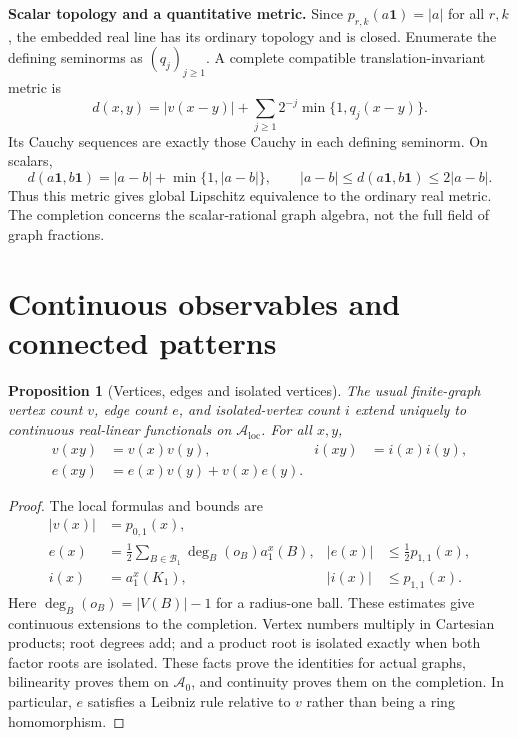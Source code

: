 \documentclass[11pt]{article}
\newtheorem{proposition}[theorem]{Proposition}
\theoremstyle{definition}\newtheorem{definition}[theorem]{Definition}
\newcommand{\A}{\mathcal A}
\newcommand{\B}{\mathcal B}
\newcommand{\one}{\mathbf 1}
\DeclareMathOperator{\degroot}{deg}
\begin{document}
\textbf{Scalar topology and a quantitative metric.} Since $p_{r,k}(a\one)=|a|$ for all $r,k$, the embedded real line has its ordinary topology and is closed. Enumerate the defining seminorms as $(q_j)_{j\ge1}$. A complete compatible translation-invariant metric is
\begin{equation}\label{eq:metric}
 d(x,y)=|v(x-y)|+\sum_{j\ge1}2^{-j}\min\{1,q_j(x-y)\}.
\end{equation}
Its Cauchy sequences are exactly those Cauchy in each defining seminorm. On scalars,
\[
 d(a\one,b\one)=|a-b|+\min\{1,|a-b|\},\qquad
 |a-b|\le d(a\one,b\one)\le2|a-b|.
\]
Thus this metric gives global Lipschitz equivalence to the ordinary real metric. The completion concerns the scalar-rational graph algebra, not the full field of graph fractions.

\section{Continuous observables and connected patterns}

\begin{proposition}[Vertices, edges and isolated vertices]\label{prop:obs}
The usual finite-graph vertex count $v$, edge count $e$, and isolated-vertex count $i$ extend uniquely to continuous real-linear functionals on $\A_{\mathrm{loc}}$. For all $x,y$,
\begin{align*}
 v(xy)&=v(x)v(y),& i(xy)&=i(x)i(y),\\
 e(xy)&=e(x)v(y)+v(x)e(y).
\end{align*}
\end{proposition}
\begin{proof}
The local formulas and bounds are
\begin{align*}
 |v(x)|&=p_{0,1}(x),\\
 e(x)&=\tfrac12\sum_{B\in\B_1}\degroot_B(o_B)a_1^x(B),
 & |e(x)|&\le\tfrac12p_{1,1}(x),\\
 i(x)&=a_1^x(K_1),& |i(x)|&\le p_{1,1}(x).
\end{align*}
Here $\degroot_B(o_B)=|V(B)|-1$ for a radius-one ball. These estimates give continuous extensions to the completion. Vertex numbers multiply in Cartesian products; root degrees add; and a product root is isolated exactly when both factor roots are isolated. These facts prove the identities for actual graphs, bilinearity proves them on $\A_0$, and continuity proves them on the completion. In particular, $e$ satisfies a Leibniz rule relative to $v$ rather than being a ring homomorphism.
\end{proof}
\end{document}
